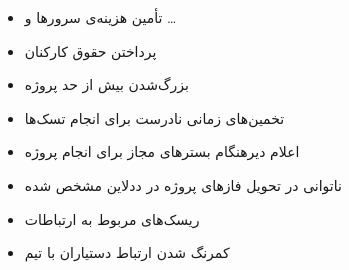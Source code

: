        \begin{itemize}
            \item تأمین‌ هزینه‌ی سرورها و \dots
            \item پرداختن حقوق کارکنان
            \item بزرگ‌شدن بیش از حد پروژه
            \item تخمین‌های زمانی نادرست برای انجام تسک‌ها
            \item اعلام دیرهنگام بسترهای مجاز برای انجام پروژه
            \item ناتوانی در تحویل فازهای پروژه در ددلاین مشخص شده
            \item ریسک‌های مربوط به ارتباطات
            \item کمرنگ شدن ارتباط دستیاران با تیم
        \end{itemize}
